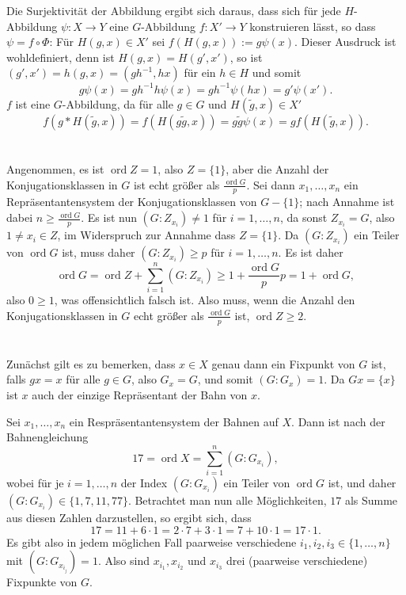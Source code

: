 \documentclass[a4paper,10pt]{article}
\theoremstyle{definition}
\newcommand{\ord}{\operatorname{ord}}
\begin{document}
Die Surjektivität der Abbildung ergibt sich daraus, dass sich für jede $H$-Abbildung $\psi : X \rightarrow Y$ eine $G$-Abbildung $f : X' \rightarrow Y$ konstruieren lässt, so dass $\psi = f \circ \Phi$: Für $H(g,x) \in X'$ sei $f(H(g,x)) :=  g \psi(x)$. Dieser Ausdruck ist wohldefiniert, denn ist $H(g,x) = H(g',x')$, so ist $(g',x') = h(g,x) = (gh^{-1},hx)$ für ein $h \in H$ und somit
\[
 g \psi(x) = g h^{-1} h \psi(x) = g h^{-1} \psi(hx) = g' \psi(x').
\]
$f$ ist eine $G$-Abbildung, da für alle $g \in G$ und $H(\tilde{g},x) \in X'$
\[
 f( g * H(\tilde{g},x) )
 = f( H(g\tilde{g}, x) )
 = g \tilde{g} \psi(x)
 = g f( H(\tilde{g},x) ).
\]





\section{}
Angenommen, es ist $\ord Z = 1$, also $Z = \{1\}$, aber die Anzahl der Konjugationsklassen in $G$ ist echt größer als $\frac{\ord G}{p}$. Sei dann $x_1, \ldots, x_n$ ein Repräsentantensystem der Konjugationsklassen von $G-\{1\}$; nach Annahme ist dabei $n \geq \frac{\ord G}{p}$. Es ist nun $(G : Z_{x_i}) \neq 1$ für $i=1,\ldots,n$, da sonst $Z_{x_i} = G$, also $1 \neq x_i \in Z$, im Widerspruch zur Annahme dass $Z = \{1\}$. Da $(G : Z_{x_i})$ ein Teiler von $\ord G$ ist, muss daher $(G : Z_{x_i}) \geq p$ für $i=1,\ldots,n$. Es ist daher
\[
 \ord G = \ord Z + \sum_{i=1}^n (G : Z_{x_i}) \geq 1 + \frac{\ord G}{p} p = 1 + \ord G,
\]
also $0 \geq 1$, was offensichtlich falsch ist. Also muss, wenn die Anzahl den Konjugationsklassen in $G$ echt größer als $\frac{\ord G}{p}$ ist, $\ord Z \geq 2$.





\section{}
Zunächst gilt es zu bemerken, dass $x \in X$ genau dann ein Fixpunkt von $G$ ist, falls $gx = x$ für alle $g \in G$, also $G_x = G$, und somit $(G : G_x) = 1$. Da $Gx = \{x\}$ ist $x$ auch der einzige Repräsentant der Bahn von $x$.

Sei $x_1, \ldots, x_n$ ein Respräsentantensystem der Bahnen auf $X$. Dann ist nach der Bahnengleichung
\[
 17 = \ord X = \sum_{i=1}^n (G : G_{x_i}),
\]
wobei für je $i=1, \ldots, n$ der Index $(G : G_{x_i})$ ein Teiler von $\ord G$ ist, und daher $(G : G_{x_i}) \in \{1,7,11,77\}$. Betrachtet man nun alle Möglichkeiten, $17$ als Summe aus diesen Zahlen darzustellen, so ergibt sich, dass
\[
 17
 = 11 + 6 \cdot 1
 = 2 \cdot 7 + 3 \cdot 1
 = 7 + 10 \cdot 1
 = 17 \cdot 1.
\]
Es gibt also in jedem möglichen Fall paarweise verschiedene $i_1, i_2, i_3 \in \{1, \ldots, n\}$ mit $(G : G_{x_{i_j}}) = 1$. Also sind $x_{i_1}, x_{i_2}$ und $x_{i_3}$ drei (paarweise verschiedene) Fixpunkte von $G$.
\end{document}
